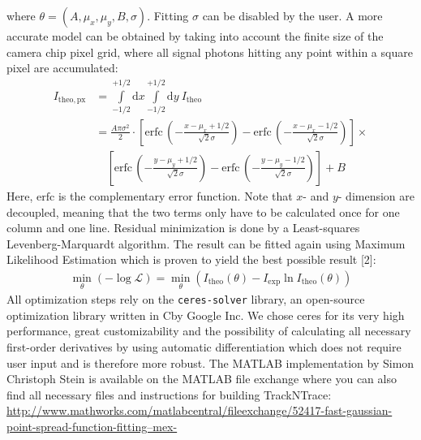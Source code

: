 \documentclass[11pt,onside]{report}
\newcommand{\D}[0]{\text{d}}
\numberwithin{equation}{chapter}
\def\CC{{C\nolinebreak[4]\hspace{-.05em}\raisebox{.4ex}{\tiny\bf ++}}}
\begin{document}
where $\theta = (A,\mu_x,\mu_y,B,\sigma)$. Fitting $\sigma$ can be disabled by the user. A more accurate model can be obtained by taking into account the finite size of the camera chip pixel grid, where all signal photons hitting any point within a square pixel are accumulated:
\begin{align*}
I_\mathrm{theo, px} &= \int\limits^{+1\slash 2}_{-1\slash 2} \D x \int\limits^{+1\slash 2}_{-1\slash 2} \D y\: I_\mathrm{theo} \\
&= \frac{A \pi \sigma^2}{2}\cdot \left[\mathrm{erfc}\,\left(-\frac{x-\mu_x+1\slash 2}{\sqrt{2} \sigma}\right) - \mathrm{erfc}\,\left(-\frac{x-\mu_x-1\slash 2}{\sqrt{2} \sigma}\right)\right] \times \\
&\quad \left[\mathrm{erfc}\,\left(-\frac{y-\mu_y+1\slash 2}{\sqrt{2} \sigma}\right) - \mathrm{erfc}\,\left(-\frac{y-\mu_y-1\slash 2}{\sqrt{2} \sigma}\right)\right] +B
\end{align*}
Here, $\mathrm{erfc}$ is the complementary error function. Note that $x$- and $y$- dimension are decoupled, meaning that the two terms only have to be calculated once for one column and one line. Residual minimization is done by a Least-squares Levenberg-Marquardt algorithm. The result can be fitted again using Maximum Likelihood Estimation which is proven to yield the best possible result [2]:
\begin{align*}
\min_\theta (-\log\mathcal{L}) = \min_\theta (I_\mathrm{theo}(\theta) - I_\mathrm{exp} \ln I_\mathrm{theo}(\theta))
\end{align*}
All optimization steps rely on the \texttt{ceres-solver} library, an open-source optimization library written in \CC by Google Inc. We chose ceres for its very high performance, great customizability and the possibility of calculating all necessary first-order derivatives by using automatic differentiation which does not require user input and is therefore more robust. The MATLAB implementation by Simon Christoph Stein is available on the MATLAB file exchange where you can also find all necessary files and instructions for building {TrackNTrace}:  \href{http://www.mathworks.com/matlabcentral/fileexchange/52417-fast-gaussian-point-spread-function-fitting--mex-}{http://www.mathworks.com/matlabcentral/fileexchange/52417-fast-gaussian-point-spread-function-fitting--mex-}\\[10pt]
\end{document}
